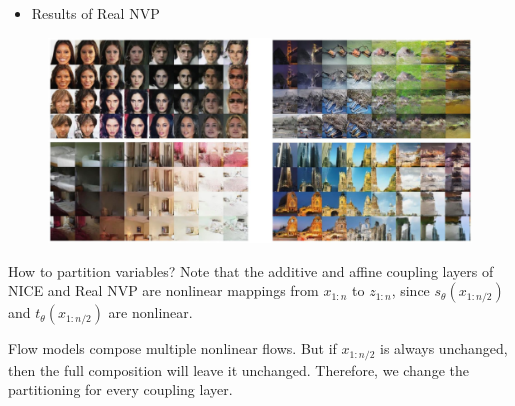 \begin{frame}[allowframebreaks]

\begin{itemize}
    \item Results of Real NVP
\end{itemize}

\begin{figure}[H]
    \centering
    \includegraphics[width=1.0\textwidth]{.././assets/10.14.png}
\end{figure}

\par\noindent\textcolor{gray}{\hdashrule{\textwidth}{0.4pt}{1pt 2pt}}

\end{frame}

\begin{frame}[allowframebreaks]

\begin{myconceptblock}{10.28}{How to partition variables?}
    Note that the additive and affine coupling layers of NICE and Real NVP are nonlinear mappings from $x_{1: n}$ to $z_{1: n}$, since $s_{\theta}\left(x_{1: n / 2}\right)$ and $t_{\theta}\left(x_{1: n / 2}\right)$ are nonlinear.

    Flow models compose multiple nonlinear flows. But if $x_{1: n / 2}$ is always unchanged, then the full composition will leave it unchanged. Therefore, we change the partitioning for every coupling layer.
\end{myconceptblock}

\end{frame}

